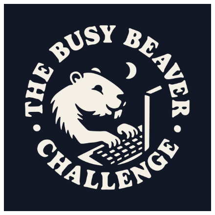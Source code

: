 \documentclass[a4paper,british]{article}
\theoremstyle{definition} %
\numberwithin{equation}{section}
\theoremstyle{definition} %
\begin{document}
\begin{figure}
    \vspace{-33\baselineskip}
    \hspace*{\fill}
    \includegraphics[width=0.7\linewidth]{figures/bbchallenge_logo.png} %
\end{figure}
\end{document}
